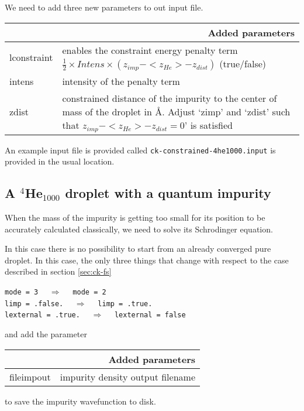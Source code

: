 \documentclass[10pt,a4paper]{article}
\begin{document}
	We need to add three new parameters to out input file.
		\begin{center}
		\begin{tabular}{l|p{9.75cm}}
			\multicolumn{2}{r}{\textbf{Added parameters}} \\
			\hline\hline
			lconstraint 			& enables the constraint energy penalty term $\frac{1}{2}\times Intens\times(z_{imp}-<z_{He}>-z_{dist})$ (true/false) \\
			intens 			& intensity of the penalty term \\
			zdist 			& constrained distance of the impurity to the center of mass of the droplet in \AA. Adjust `zimp' and `zdist' such that $z_{imp}-<z_{He}>-z_{dist}=0$' is satisfied  \\
		\end{tabular}
	\end{center}
	\vspace{0.2cm}
	An example input file is provided called \verb|ck-constrained-4he1000.input| is provided in the usual location.
	
	\subsection{A $^4$He$_{1000}$ droplet with a quantum impurity}
	When the mass of the impurity is getting too small for its position to be accurately calculated classically, we need to solve its Schrodinger equation. 
	
	In this case there is no possibility to start from an already converged pure droplet. In this case, the only three things that change with respect to the case described in section \ref{sec:ck-fs}
	\begin{center}
		\verb|mode = 3|	$\quad\Longrightarrow\quad$	\verb|mode = 2| \\
		\verb|limp = .false.|	$\quad\Longrightarrow\quad$	\verb|limp = .true.| \\
		\verb|lexternal = .true.|	$\quad\Longrightarrow\quad$	\verb|lexternal = false|
	\end{center}
		
	and add the parameter
	
	\begin{center}
	\begin{tabular}{l|p{9.75cm}}
		\multicolumn{2}{r}{\textbf{Added parameters}} \\
		\hline\hline
		fileimpout			&  impurity density output filename  
	\end{tabular}
	\end{center}
	to save the impurity wavefunction to disk.
\end{document}

